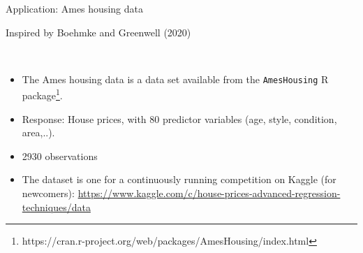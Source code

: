 \documentclass[
  10pt,
  ignorenonframetext,
]{beamer}
\providecommand{\tightlist}{%
  \setlength{\itemsep}{0pt}\setlength{\parskip}{0pt}}
\begin{document}
\begin{frame}[fragile]
\begin{block}{Application: Ames housing data}
\label{application-ames-housing-data}
\scriptsize

Inspired by Boehmke and Greenwell (2020)

\normalsize

\(~\)

\begin{itemize}
\tightlist
\item
  The Ames housing data is a data set available from the
  \texttt{AmesHousing} R
  package\footnote{https://cran.r-project.org/web/packages/AmesHousing/index.html}.
\end{itemize}

\vspace{2mm}

\begin{itemize}
\tightlist
\item
  Response: House prices, with 80 predictor variables (age, style,
  condition, area,..).
\end{itemize}

\vspace{2mm}

\begin{itemize}
\tightlist
\item
  2930 observations
\end{itemize}

\vspace{2mm}

\begin{itemize}
\tightlist
\item
  The dataset is one for a continuously running competition on Kaggle
  (for newcomers):
  \url{https://www.kaggle.com/c/house-prices-advanced-regression-techniques/data}
\end{itemize}
\end{block}
\end{frame}
\end{document}
